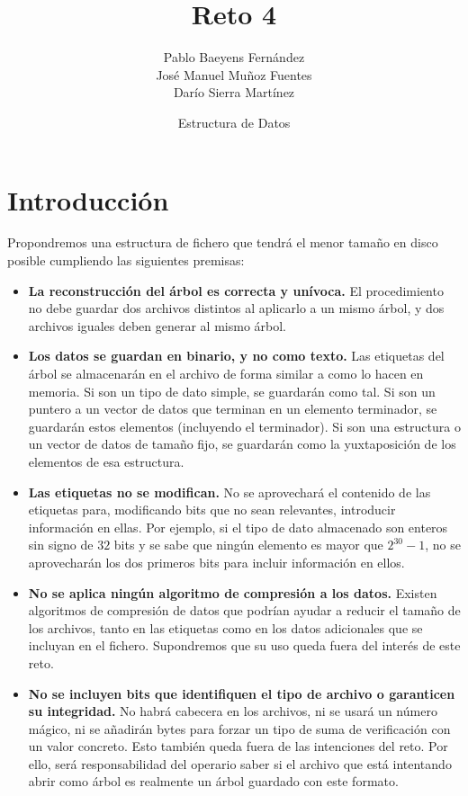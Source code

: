\documentclass{article}
\title{Reto 4}
\date{Estructura de Datos}
\author{Pablo Baeyens Fernández\\José Manuel Muñoz Fuentes\\Darío Sierra Martínez}
\begin{document}
\maketitle

\section{Introducción}


Propondremos una estructura de fichero que tendrá el menor tamaño en disco posible cumpliendo las siguientes premisas:
\begin{itemize}
	\item \textbf{La reconstrucción del árbol es correcta y unívoca.} El procedimiento no debe guardar dos archivos distintos al aplicarlo a un mismo árbol, y dos archivos iguales deben generar al mismo árbol.
	\item \textbf{Los datos se guardan en binario, y no como texto.} Las etiquetas del árbol se almacenarán en el archivo de forma similar a como lo hacen en memoria. Si son un tipo de dato simple, se guardarán como tal. Si son un puntero a un vector de datos que terminan en un elemento terminador, se guardarán estos elementos (incluyendo el terminador). Si son una estructura o un vector de datos de tamaño fijo, se guardarán como la yuxtaposición de los elementos de esa estructura.
	\item \textbf{Las etiquetas no se modifican.} No se aprovechará el contenido de las etiquetas para, modificando bits que no sean relevantes, introducir información en ellas. Por ejemplo, si el tipo de dato almacenado son enteros sin signo de $32$ bits y se sabe que ningún elemento es mayor que $2^{30}-1$, no se aprovecharán los dos primeros bits para incluir información en ellos.
	\item \textbf{No se aplica ningún algoritmo de compresión a los datos.} Existen algoritmos de compresión de datos que podrían ayudar a reducir el tamaño de los archivos, tanto en las etiquetas como en los datos adicionales que se incluyan en el fichero. Supondremos que su uso queda fuera del interés de este reto.
	\item \textbf{No se incluyen bits que identifiquen el tipo de archivo o garanticen su integridad.} No habrá cabecera en los archivos, ni se usará un número mágico, ni se añadirán bytes para forzar un tipo de suma de verificación con un valor concreto. Esto también queda fuera de las intenciones del reto. Por ello, será responsabilidad del operario saber si el archivo que está intentando abrir como árbol es realmente un árbol guardado con este formato.
\end{itemize}
\end{document}
